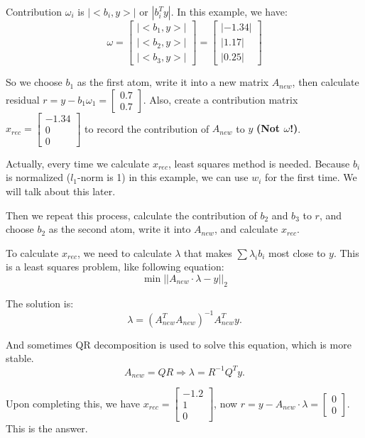 \documentclass[12pt]{ctexart}
\begin{document}
Contribution $\omega_i$ is $|<b_i, y>|$ or $|b_i^Ty|$. In this example, we have:
\[
  \omega = \begin{bmatrix}
    |<b_1, y>| \\
    |<b_2, y>| \\
    |<b_3, y>|
  \end{bmatrix}
  = \begin{bmatrix}
    |-1.34| \\
    |1.17| \\
    |0.25|
  \end{bmatrix}
\]

So we choose $b_1$ as the first atom, write it into a new matrix $A_{new}$, then
calculate residual $r = y - b_1\omega_1 = \begin{bmatrix} 0.7 \\ 0.7 \end{bmatrix}$.
Also, create a contribution matrix $x_{rec} = \begin{bmatrix} -1.34 \\ 0 \\ 0
\end{bmatrix}$ to record the contribution of $A_{new}$ to $y$ \textbf{(Not $\omega$!)}.

Actually, every time we calculate $x_{rec}$, least squares method is needed.
Because $b_i$ is normalized ($l_1$-norm is 1) in this example, we can use $w_i$ for
the first time. We will talk about this later.

Then we repeat this process, calculate the contribution of $b_2$ and $b_3$ to $r$,
and choose $b_2$ as the second atom, write it into $A_{new}$, and calculate $x_{rec}$.

To calculate $x_{rec}$, we need to calculate $\lambda$ that makes $\sum \lambda_i b_i$
most close to $y$. This is a least squares problem, like following equation:
\[
  \min ||A_{new} \cdot \lambda - y||_2
\]

The solution is:
\[
  \lambda = (A_{new}^TA_{new})^{-1}A_{new}^Ty.
\]

And sometimes QR decomposition is used to solve this equation, which is more stable.
\[
  A_{new} = QR \Rightarrow \lambda = R^{-1}Q^Ty.
\]

Upon completing this, we have $x_{rec} = \begin{bmatrix} -1.2 \\ 1 \\ 0 \end{bmatrix}$,
now $r = y - A_{new} \cdot \lambda = \begin{bmatrix} 0 \\ 0 \end{bmatrix}$.  This is the
answer.
\end{document}
